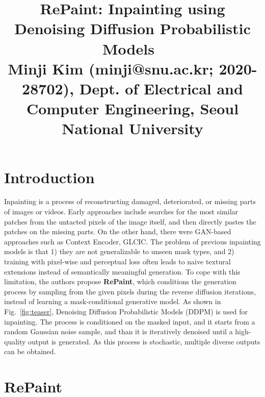 \documentclass[10pt,twocolumn,letterpaper]{article}
\begin{document}
\title{RePaint: Inpainting using Denoising Diffusion Probabilistic Models~\cite{repaint} \\ {\rm {\normalsize Minji Kim (minji@snu.ac.kr; 2020-28702), Dept. of Electrical and Computer Engineering, Seoul National University}}}   %

\maketitle
\thispagestyle{empty}


\section{Introduction}
Inpainting is a process of reconstructing damaged, deteriorated, or missing parts of images or videos.
Early approaches include searches for the most similar patches from the untacted pixels of the image itself, and then directly pastes the patches on the missing parts.
On the other hand, there were GAN-based approaches such as Context Encoder, GLCIC.
The problem of previous inpainting models is that 1) they are not generalizable to unseen mask types, and 2) training with pixel-wise and perceptual loss often leads to naive textural extensions instead of semantically meaningful generation.
To cope with this limitation, the authors propose \textbf{RePaint}, which conditions the generation process by sampling from the given pixels during the reverse diffusion iterations, instead of learning a mask-conditional generative model.
As shown in Fig.~\ref{fig:teaser}, Denoising Diffusion Probabilistic Models (DDPM) is used for inpainting.
The process is conditioned on the masked input, and it starts from a random Gaussian noise sample, and than it is iteratively denoised until a high-quality output is generated.
As this process is stochastic, multiple diverse outputs can be obtained.



\section{RePaint}
\end{document}
